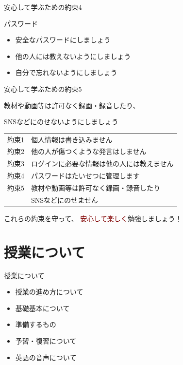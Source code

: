 \documentclass[
  ignorenonframetext,
  aspectratio=169,
  xcolor=dvipsnames]{beamer}
\providecommand{\tightlist}{%
  \setlength{\itemsep}{0pt}\setlength{\parskip}{0pt}}
\begin{document}
\begin{frame}{安心して学ぶための約束4}
\protect{}\label{ux5b89ux5fc3ux3057ux3066ux5b66ux3076ux305fux3081ux306eux7d04ux675f4}
\LARGE

パスワード

\pause

\begin{itemize}[<+->]
\tightlist
\item
  安全なパスワードにしましょう
\item
  他の人には教えないようにしましょう
\item
  自分で忘れないようにしましょう
\end{itemize}
\end{frame}

\begin{frame}{安心して学ぶための約束5}
\protect{}\label{ux5b89ux5fc3ux3057ux3066ux5b66ux3076ux305fux3081ux306eux7d04ux675f5}
\LARGE

教材や動画等は許可なく録画・録音したり、

SNSなどにのせないようにしましょう
\end{frame}

\begin{frame}{}
\protect{}\label{section-2}
\Large

\begin{tabular}{ll}
約束1& 個人情報は書き込みません\\
約束2& 他の人が傷つくような発言はしません\\
約束3& ログインに必要な情報は他の人には教えません\\
約束4& パスワードはたいせつに管理します\\
約束5& 教材や動画等は許可なく録画・録音したり\\
&      SNSなどにのせません
\end{tabular}

\vfill

これらの\textcolor{NavyBlue}{約束を守って}、
\textcolor{Maroon}{安心して楽しく}勉強しましょう！
\end{frame}

\section{授業について}\label{ux6388ux696dux306bux3064ux3044ux3066}

\begin{frame}{授業について}
\protect{}\label{ux6388ux696dux306bux3064ux3044ux3066-1}
\LARGE

\begin{itemize}[<+->]
\tightlist
\item
  授業の進め方について
\item
  基礎基本について
\item
  準備するもの
\item
  予習・復習について
\item
  英語の音声について
\end{itemize}
\end{frame}
\end{document}
